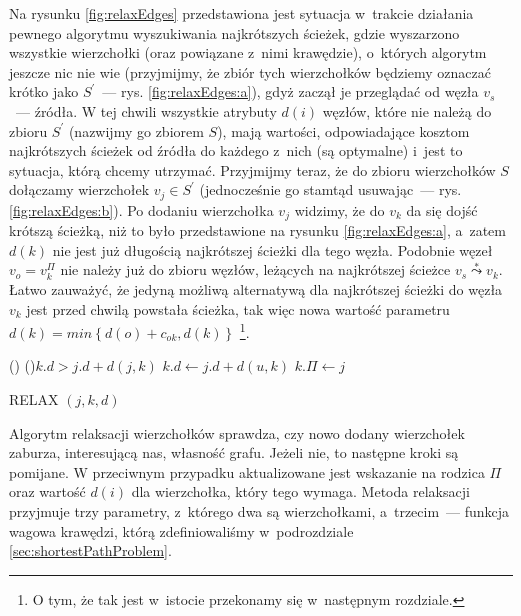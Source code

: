Na rysunku \ref{fig:relaxEdges} przedstawiona jest sytuacja w~trakcie działania pewnego algorytmu wyszukiwania najkrótszych ścieżek, gdzie wyszarzono wszystkie wierzchołki (oraz powiązane z~nimi krawędzie), o~których algorytm jeszcze nic nie wie (przyjmijmy, że zbiór tych wierzchołków będziemy oznaczać krótko jako $S^{'}$~---  rys. \ref{fig:relaxEdges:a}), gdyż zaczął je przeglądać od węzła $v_{s}$~---  źródła. W tej chwili wszystkie atrybuty $d \left( i \right)$ węzłów, które nie należą do zbioru $S^{'}$ (nazwijmy go zbiorem $S$), mają wartości, odpowiadające kosztom najkrótszych ścieżek od źródła do każdego z~nich (są optymalne) i~jest to sytuacja, którą chcemy utrzymać. Przyjmijmy teraz, że do zbioru wierzchołków $S$ dołączamy wierzchołek $v_{j} \in S^{'}$ (jednocześnie go stamtąd usuwając~---  rys. \ref{fig:relaxEdges:b}). Po dodaniu wierzchołka $v_{j}$ widzimy, że do $v_{k}$ da się dojść krótszą ścieżką, niż to było przedstawione na rysunku \ref{fig:relaxEdges:a}, a~zatem $d \left( k \right)$ nie jest już długością najkrótszej ścieżki dla tego węzła. Podobnie węzeł $v_{o} = v_{k}^{\Pi}$ nie należy już do zbioru węzłów, leżących na najkrótszej ścieżce $v_{s} \overset{*}\leadsto v_{k}$. Łatwo zauważyć, że jedyną możliwą alternatywą dla najkrótszej ścieżki do węzła $v_{k}$ jest przed chwilą powstała ścieżka, tak więc nowa wartość parametru $d \left( k \right) = min \left\{ d \left( o \right) + c_{ok}, d \left( k \right) \right\} $ \footnote{O tym, że tak jest w~istocie przekonamy się w~następnym rozdziale.}.

\begin{pseudokod}[!htbp]
\DontPrintSemicolon
\Begin(){
	\If(){$ k.d > j.d + d \left( j, k \right)$} {
		$ k.d \longleftarrow j.d + d \left( u, k \right)$ \;
		$ k.\Pi \longleftarrow j$ \;
	}
}
\caption{RELAX $\left( j, k, d \right)$ \label{alg:relax}}
\end{pseudokod}

Algorytm relaksacji wierzchołków sprawdza, czy nowo dodany wierzchołek zaburza, interesującą nas, własność grafu. Jeżeli nie, to następne kroki są pomijane. W przeciwnym przypadku aktualizowane jest wskazanie na rodzica $\Pi$ oraz wartość $d \left( i \right)$  dla wierzchołka, który tego wymaga. Metoda relaksacji przyjmuje trzy parametry, z~którego dwa są wierzchołkami, a~trzecim~--- funkcja wagowa krawędzi, którą zdefiniowaliśmy w~podrozdziale \ref{sec:shortestPathProblem}.

